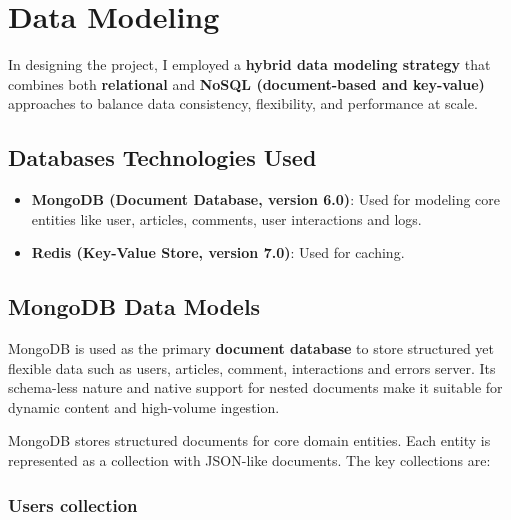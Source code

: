 
\chapter{Data Modeling}\label{ch:data-modeling}

In designing the project, I employed a \textbf{hybrid data modeling strategy} that combines both \textbf{relational}
and \textbf{NoSQL (document-based and key-value)} approaches to balance data consistency, flexibility, and performance at scale.

\section{Databases Technologies Used}\label{sec:databases-technologies-used}

\begin{itemize}
    \item \textbf{MongoDB (Document Database, version 6.0)}: Used for modeling core entities like user, articles, comments, user interactions and logs.
    \item \textbf{Redis (Key-Value Store, version 7.0)}: Used for caching.
\end{itemize}

\section{MongoDB Data Models}\label{sec:mongodb-data-models}

MongoDB is used as the primary \textbf{document database} to store structured yet flexible data such as users, articles, comment, interactions and errors server.
Its schema-less nature and native support for nested documents make it suitable for dynamic content and high-volume ingestion\cite{pydantic}.

MongoDB stores structured documents for core domain entities.
Each entity is represented as a collection with JSON-like documents.
The key collections are:

\subsection{Users collection}\label{subsec:users-collection}



